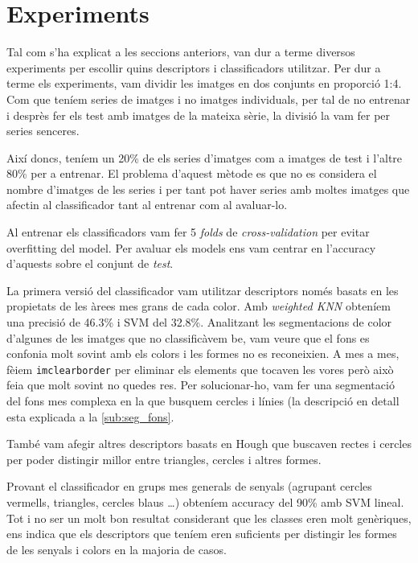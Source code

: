 
\section{Experiments}%
\label{sec:experiments}

Tal com s'ha explicat a les seccions anteriors, van dur a terme diversos experiments per escollir quins descriptors
i classificadors utilitzar. Per dur a terme els experiments, vam dividir les imatges en dos conjunts en proporció 1:4.
Com que teníem series de imatges i no imatges individuals, per tal de no entrenar i desprès fer els test amb imatges
de la mateixa sèrie, la divisió la vam fer per series senceres.

Així doncs, teníem un 20\% de els series d'imatges com a imatges de test i l'altre 80\% per a entrenar. El problema d'aquest
mètode es que no es considera el nombre d'imatges de les series i per tant pot haver series amb moltes imatges que
afectin al classificador tant al entrenar com al avaluar-lo.

Al entrenar els classificadors vam fer 5 \emph{folds} de \emph{cross-validation} per evitar overfitting del model. Per
avaluar els models ens vam centrar en l'accuracy d'aquests sobre el conjunt de \emph{test}.

La primera versió del classificador vam utilitzar descriptors només basats en les propietats de les àrees mes grans
de cada color. Amb \emph{weighted KNN} obteníem una precisió de 46.3\% i SVM del 32.8\%. Analitzant les segmentacions
de color d'algunes de les imatges que no classificàvem be, vam veure que el fons es confonia molt sovint amb els colors
i les formes no es reconeixien. A mes a mes, fèiem \texttt{imclearborder} per eliminar els elements que tocaven les vores
però això feia que molt sovint no quedes res. Per solucionar-ho, vam fer una segmentació del fons mes complexa en la
que busquem cercles i línies (la descripció en detall esta explicada a la \cref{sub:seg_fons}.

També vam afegir altres descriptors basats en Hough que buscaven rectes i cercles per poder distingir millor entre
triangles, cercles i altres formes.

Provant el classificador en grups mes generals de senyals (agrupant cercles vermells, triangles, cercles blaus \dots)
obteníem accuracy del 90\% amb SVM lineal. Tot i no ser un molt bon resultat considerant que les classes eren molt
genèriques, ens indica que els descriptors que teníem eren suficients per distingir les formes de les senyals i colors en la majoria de casos.

